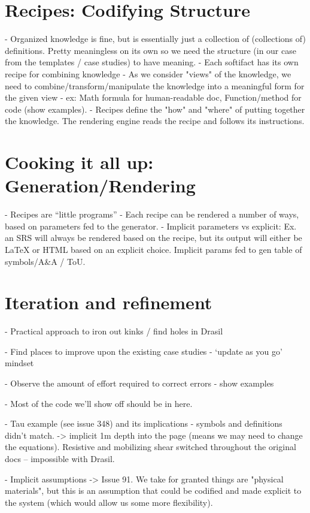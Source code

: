 \section{Recipes: Codifying Structure}
  - Organized knowledge is fine, but is essentially just a collection of (collections of) definitions. Pretty meaningless on its own so we need the structure (in our case from the templates / case studies) to have meaning.
  - Each softifact has its own recipe for combining knowledge
  - As we consider \sfs{} "views" of the knowledge, we need to 
  combine/transform/manipulate the knowledge into a meaningful form for the 
  given view - ex: Math formula for human-readable doc, Function/method for 
  code (show examples).
  - Recipes define the "how" and "where" of putting together the knowledge. The rendering engine reads the recipe and follows its instructions.

\section{Cooking it all up: Generation/Rendering}
  - Recipes are “little programs”
  - Each recipe can be rendered a number of ways, based on parameters fed to the generator.
  -  Implicit parameters vs explicit: Ex. an SRS will always be rendered based on the recipe, but its output will either be LaTeX or HTML based on an explicit choice. Implicit params fed to gen table of symbols/A\&A / ToU.


\section{Iteration and refinement}

  - Practical approach to iron out kinks / find holes in Drasil

  - Find places to improve upon the existing case studies - ‘update as you go’ 
  mindset

  - Observe the amount of effort required to correct errors - show examples

  - Most of the code we’ll show off should be in here.

  - Tau example (see issue 348) and its implications - symbols and definitions 
  didn't match. -> implicit 1m depth into the page (means we may need to change 
  the equations). Resistive and mobilizing shear switched throughout the 
  original docs -- impossible with Drasil.

  -  Implicit assumptions -> 
  Issue 91. We take for granted things are "physical 
  materials", but this is an assumption that could be codified and made 
  explicit to the system (which would allow us some more flexibility).